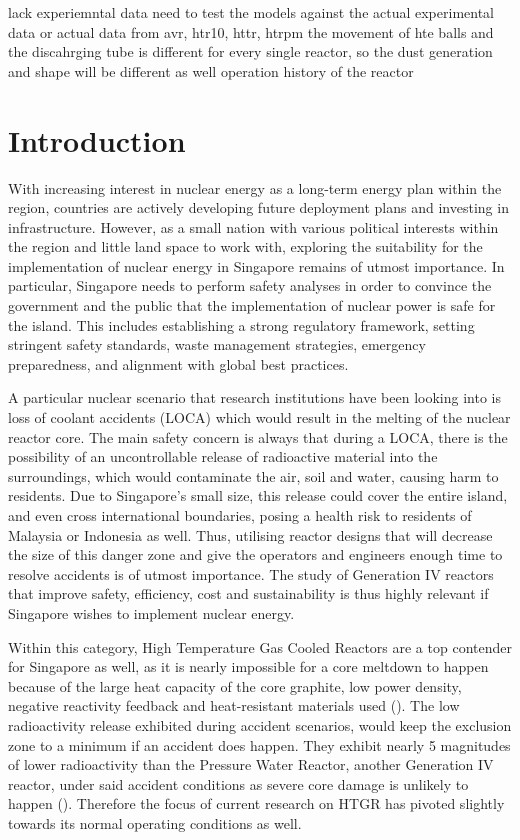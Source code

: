 \documentclass{article}
\begin{document}
lack experiemntal data 
need to test the models against the actual experimental data or actual data from avr, htr10, httr, htrpm
the movement of hte balls and the discahrging tube is different for every single reactor, so the dust generation and shape will be different as well 
operation history of the reactor 


\clearpage


\section{Introduction}
With increasing interest in nuclear energy as a long-term energy plan within the region, countries are actively developing future deployment plans and investing in infrastructure. However, as a small nation with various political interests within the region and little land space to work with, exploring the suitability for the implementation of nuclear energy in Singapore remains of utmost importance. In particular, Singapore needs to perform safety analyses in order to convince the government and the public that the implementation of nuclear power is safe for the island. This includes establishing a strong regulatory framework, setting stringent safety standards, waste management strategies, emergency preparedness, and alignment with global best practices.

A particular nuclear scenario that research institutions have been looking into is loss of coolant accidents (LOCA) which would result in the melting of the nuclear reactor core. The main safety concern is always that during a LOCA, there is the possibility of an uncontrollable release of radioactive material into the surroundings, which would contaminate the air, soil and water, causing harm to residents. Due to Singapore's small size, this release could cover the entire island, and even cross international boundaries, posing a health risk to residents of Malaysia or Indonesia as well. Thus, utilising reactor designs that will decrease the size of this danger zone and give the operators and engineers enough time to resolve accidents is of utmost importance. The study of Generation IV reactors that improve safety, efficiency, cost and sustainability is thus highly relevant if Singapore wishes to implement nuclear energy.

Within this category, High Temperature Gas Cooled Reactors are a top contender for Singapore as well, as it is nearly impossible for a core meltdown to happen because of the large heat capacity of the core graphite, low power density, negative reactivity feedback and heat-resistant materials used (\cite{TAKAMATSU2014379}). The low radioactivity release exhibited during accident scenarios, would keep the exclusion zone to a minimum if an accident does happen. They exhibit nearly 5 magnitudes of lower radioactivity than the Pressure Water Reactor, another Generation IV reactor, under said accident conditions as severe core damage is unlikely to happen (\cite{ZHANG20091212}). Therefore the focus of current research on HTGR has pivoted slightly towards its normal operating conditions as well. 
\end{document}
